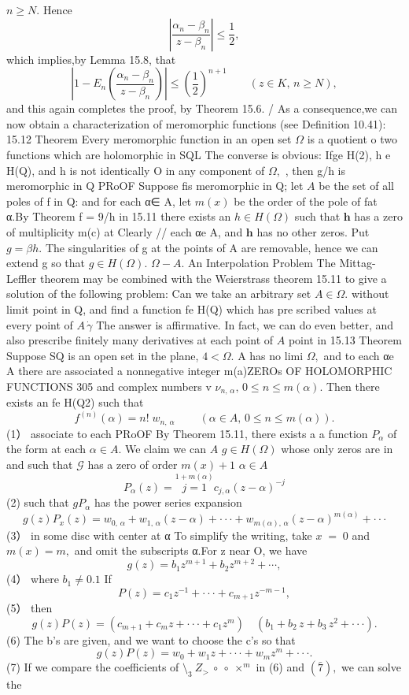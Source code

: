 $n\geq N.$ Hence $$ \left|{\frac{\alpha_{n}-\beta_{n}}{z-\beta_{n}}}\right|\leq{\frac{1}{2}}, $$ which implies,by Lemma 15.8, that $$ \left|1-E_{n}\!\left(\frac{\alpha_{n}-\beta_{n}}{z-\beta_{n}}\right)\right|\leq\!\left(\frac{1}{2}\right)^{n+1}\qquad(z\in K,\,n\geq N), $$ and this again completes the proof, by Theorem 15.6. / As a consequence,we can now obtain a characterization of meromorphic functions (see Definition 10.41): 15.12 Theorem Every meromorphic function in an open set $\Omega$ is a quotient o two functions which are holomorphic in SQL The converse is obvious: Ifge H(2), h e H(Q), and h is not identically O in any component of $\Omega,$ , then g/h is meromorphic in Q PRoOF Suppose fis meromorphic in Q; let $\scriptstyle A$ be the set of all poles of f in Q: and for each α∈ A, let $\scriptstyle m(x)$ be the order of the pole of fat α.By Theorem f = 9/h in 15.11 there exists an $h\in H(\Omega)$ such that ${\boldsymbol{h}}$ has a zero of multiplicity m(c) at Clearly // each αe A, and $\boldsymbol{h}$ has no other zeros. Put $\scriptstyle g=\beta h.$ The singularities of g at the points of A are removable, hence we can extend g so that $g\in H(\Omega).$ $\Omega-A.$ An Interpolation Problem The Mittag-Leffler theorem may be combined with the Weierstrass theorem 15.11 to give a solution of the following problem: Can we take an arbitrary set $A\in\Omega.$ without limit point in Q, and find a function fe H(Q) which has pre scribed values at every point of $A\,{\dot{\gamma}}$ The answer is affirmative. In fact, we can do even better, and also prescribe finitely many derivatives at each point of $\scriptstyle A$ point in 15.13 Theorem Suppose SQ is an open set in the plane, $4<\Omega.$ A has no limi $\Omega,$ and to each αe A there are associated a nonnegative integer m(a)ZEROs OF HOLOMORPHIC FUNCTIONS 305 and complex numbers v $\nu_{n,\,\alpha},\,0\leq n\leq m(\alpha).$ Then there exists an fe H(Q2) such that $$ f^{(n)}(\alpha)=n!\;w_{n,\,\alpha}\;\;\;\;\;\;\;\;(\alpha\in A,\,0\leq n\leq m(\alpha)). $$ (1） associate to each PRoOF By Theorem 15.11, there exists a a function $P_{\alpha}$ of the form at each $\alpha\in A.$ We claim we can $\scriptstyle A$ $g\in H(\Omega)$ whose only zeros are in and such that $\scriptstyle{\mathcal{G}}$ has a zero of order $m(x)+1$ $\alpha\in A$ $$ P_{\alpha}(z)=\stackrel{1+m(\alpha)}{\displaystyle{j=1}}c_{j,\alpha}(z-\alpha)^{-j} $$ (2) such that $g P_{\alpha}$ has the power series expansion $$ g(z)P_{x}(z)=w_{0,\,\alpha}+w_{1,\,\alpha}(z-\alpha)+\cdot\cdot\cdot+w_{m(\alpha),\,\alpha}(z-\alpha)^{m(\alpha)}+\cdot\cdot\cdot $$ (3） in some disc with center at α To simplify the writing, take $\scriptstyle x\;=\;0$ and $m(x)=m,$ and omit the subscripts α.For z near O, we have $$ g(z)=b_{1}z^{m+1}+b_{2}z^{m+2}+\cdots, $$ (4） where $b_{1}\neq0.1$ If $$ P(z)=c_{1}z^{-1}+\cdot\cdot\cdot+c_{m+1}z^{-m-1}, $$ (5） then $$ g(z)P(z)=(c_{m+1}+c_{m}z+\cdot\cdot\cdot+c_{1}z^{m})\quad(b_{1}+b_{2}\,z+b_{3}\,z^{2}+\cdot\cdot\cdot). $$ (6) The b's are given, and we want to choose the c's so that $$ g(z)P(z)=w_{0}+w_{1}z+\cdot\cdot\cdot+w_{m}z^{m}+\cdot\cdot\cdot. $$ (7) If we compare the coefficients of $\setminus_{3}\ Z_{>}\ \circ\ \circ\ \times^{m}$ in (6) and $({\bar{7}}),$ we can solve the 